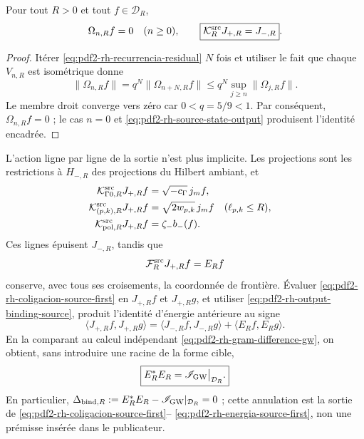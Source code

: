 \begin{proposition}
\label{prop:pdf2-rh-omega-cero}
Pour tout \(R>0\) et tout \(f\in\mathcal D_R\),
\begin{equation}\label{eq:pdf2-rh-output-binding-source}
 \Omega_{n,R}f=0\quad(n\geq0),
 \qquad
 \boxed{\mathcal K_R^{\rm src}J_{+,R}=J_{-,R}}.
\end{equation}
\end{proposition}

\begin{proof}
Itérer \eqref{eq:pdf2-rh-recurrencia-residual} \(N\) fois et utiliser le fait que chaque
\(V_{n,R}\) est isométrique donne
\[
 \|\Omega_{n,R}f\|
 =q^N\|\Omega_{n+N,R}f\|
 \leq q^N\sup_{j\geq n}\|\Omega_{j,R}f\|.
\]
Le membre droit converge vers zéro car \(0<q=5/9<1\). Par conséquent,
\(\Omega_{n,R}f=0\) ; le cas \(n=0\) et
\eqref{eq:pdf2-rh-source-state-output} produisent l'identité encadrée.
\end{proof}

L'action ligne par ligne de la sortie n'est plus implicite. Les projections sont
les restrictions à \(H_{-,R}\) des projections du Hilbert ambiant, et
\begin{equation}\label{eq:pdf2-rh-salidas-generador-a-generador}
\begin{aligned}
 \mathcal K_{\Gamma0,R}^{\rm src}J_{+,R}f
  &=\sqrt{-c_\Gamma}\,j_mf,\\
 \mathcal K_{(p,k),R}^{\rm src}J_{+,R}f
  &=\sqrt{2w_{p,k}}\,j_mf
  &&(\ell_{p,k}\leq R),\\
 \mathcal K_{{\rm pol},R}^{\rm src}J_{+,R}f
  &=\zeta_-b_-(f).
\end{aligned}
\end{equation}
Ces lignes épuisent \(J_{-,R}\), tandis que
\begin{equation}\label{eq:pdf2-rh-frontera-generador-a-generador}
 \mathcal F_R^{\rm src}J_{+,R}f=E_Rf
\end{equation}
conserve, avec tous ses croisements, la coordonnée de frontière.
Évaluer \eqref{eq:pdf2-rh-coligacion-source-first} en \(J_{+,R}f\) et
\(J_{+,R}g\), et utiliser \eqref{eq:pdf2-rh-output-binding-source}, produit
l'identité d'énergie antérieure au signe
\begin{equation}\label{eq:pdf2-rh-energia-source-first}
 \boxed{
 \langle J_{+,R}f,J_{+,R}g\rangle
 =\langle J_{-,R}f,J_{-,R}g\rangle
  +\langle E_Rf,E_Rg\rangle.}
\end{equation}
En la comparant au calcul indépendant
\eqref{eq:pdf2-rh-gram-difference-gw}, on obtient, sans introduire une racine de
la forme cible,
\begin{equation}\label{eq:pdf2-rh-binding-source-first}
 \boxed{E_R^*E_R=\mathscr I_{\rm GW}\big|_{\mathcal D_R}.}
\end{equation}
En particulier,
\(\Delta_{{\rm bind},R}
:=E_R^*E_R-\mathscr I_{\rm GW}|_{\mathcal D_R}=0\) ; cette annulation est la
sortie de \eqref{eq:pdf2-rh-coligacion-source-first}--
\eqref{eq:pdf2-rh-energia-source-first}, non une prémisse insérée dans le
publicateur.

